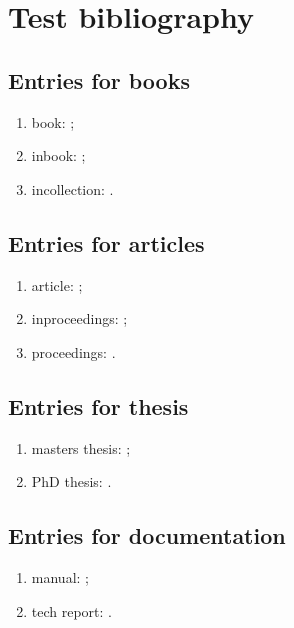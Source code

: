 \section{Test bibliography}

\subsection{Entries for books}

\begin{enumerate}
\item book: \cite{author2023book};
\item inbook: \cite{author2023inbook};
\item incollection: \cite{author2023incollection}.
\end{enumerate}

\subsection{Entries for articles}

\begin{enumerate}
\item article: \cite{author2023article};
\item inproceedings: \cite{author2023inproceedings};
\item proceedings: \cite{author2023proceedings}.
\end{enumerate}

\subsection{Entries for thesis}

\begin{enumerate}
\item masters thesis: \cite{author2023mastersthesis};
\item PhD thesis: \cite{author2023phdthesis}.
\end{enumerate}

\subsection{Entries for documentation}

\begin{enumerate}
\item manual: \cite{author2023manual};
\item tech report: \cite{author2023techreport}.
\end{enumerate}

